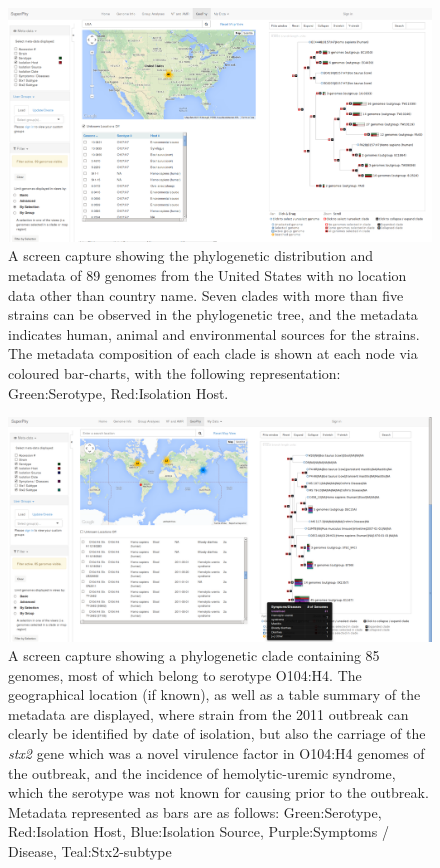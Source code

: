 \documentclass[doublespacing, linenumbers]{bmcart}
\begin{document}
\begin{backmatter}
\newpage
\begin{landscape}
\begin{figure}[h!]
  \includegraphics[width=1\columnwidth]{images/usa_o157.png}
    \caption{A screen capture showing the phylogenetic distribution and metadata of 89 genomes from the United States with no location data other than country name.  Seven clades with more than five strains can be observed in the phylogenetic tree, and the metadata indicates human, animal and environmental sources for the strains. The metadata composition of each clade is shown at each node via coloured bar-charts, with the following representation: Green:Serotype, Red:Isolation Host.}
  \label{fig:usa_o157}
\end{figure}


\newpage
\begin{figure}[h!]
  \includegraphics[width=1\columnwidth]{images/o104_clade.png}
    \caption{A screen capture showing a phylogenetic clade containing 85 genomes, most of which belong to serotype O104:H4. The geographical location (if known), as well as a table summary of the metadata are displayed, where strain from the 2011 outbreak can clearly be identified by date of isolation, but also the carriage of the \textit{stx2} gene which was a novel virulence factor in O104:H4 genomes of the outbreak, and the incidence of hemolytic-uremic syndrome, which the serotype was not known for causing prior to the outbreak. Metadata represented as bars are as follows: Green:Serotype, Red:Isolation Host, Blue:Isolation Source, Purple:Symptoms / Disease, Teal:Stx2-subtype}
  \label{fig:o104_clade}
\end{figure}
\end{landscape}


\end{backmatter}
\end{document}
